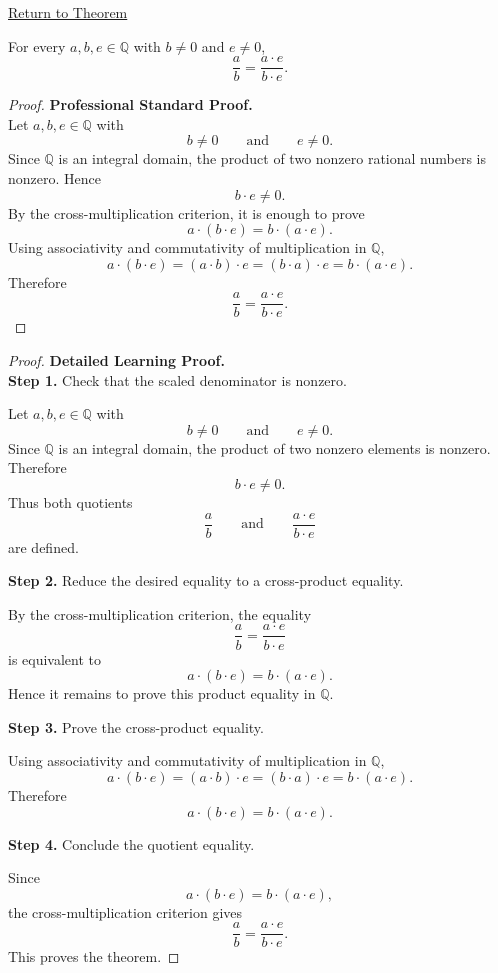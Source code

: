 \newpage
{}
\label{prf:rational-fraction-scaling}

\begin{remark*}[Return]
\hyperref[thm:rational-fraction-scaling]{Return to Theorem}
\end{remark*}

\begin{theorem*}
For every $a,b,e\in\mathbb{Q}$ with $b\neq 0$ and $e\neq 0$,
\[
\frac{a}{b}=\frac{a\cdot e}{b\cdot e}.
\]
\end{theorem*}

\begin{proof}
\textbf{Professional Standard Proof.}~\\
Let $a,b,e\in\mathbb{Q}$ with
\[
b\neq 0
\qquad\text{and}\qquad
e\neq 0.
\]
Since $\mathbb{Q}$ is an integral domain, the product of two nonzero
rational numbers is nonzero. Hence
\[
b\cdot e\neq 0.
\]
By the cross-multiplication criterion, it is enough to prove
\[
a\cdot (b\cdot e)=b\cdot (a\cdot e).
\]
Using associativity and commutativity of multiplication in $\mathbb{Q}$,
\[
a\cdot (b\cdot e)
=
(a\cdot b)\cdot e
=
(b\cdot a)\cdot e
=
b\cdot (a\cdot e).
\]
Therefore
\[
\frac{a}{b}=\frac{a\cdot e}{b\cdot e}.
\]
\end{proof}

\begin{proof}
\textbf{Detailed Learning Proof.}~\\

\textbf{Step 1.} Check that the scaled denominator is nonzero.

Let $a,b,e\in\mathbb{Q}$ with
\[
b\neq 0
\qquad\text{and}\qquad
e\neq 0.
\]
Since $\mathbb{Q}$ is an integral domain, the product of two nonzero
elements is nonzero. Therefore
\[
b\cdot e\neq 0.
\]
Thus both quotients
\[
\frac{a}{b}
\qquad\text{and}\qquad
\frac{a\cdot e}{b\cdot e}
\]
are defined.

\textbf{Step 2.} Reduce the desired equality to a cross-product equality.

By the cross-multiplication criterion, the equality
\[
\frac{a}{b}=\frac{a\cdot e}{b\cdot e}
\]
is equivalent to
\[
a\cdot (b\cdot e)=b\cdot (a\cdot e).
\]
Hence it remains to prove this product equality in $\mathbb{Q}$.

\textbf{Step 3.} Prove the cross-product equality.

Using associativity and commutativity of multiplication in $\mathbb{Q}$,
\[
a\cdot (b\cdot e)
=
(a\cdot b)\cdot e
=
(b\cdot a)\cdot e
=
b\cdot (a\cdot e).
\]
Therefore
\[
a\cdot (b\cdot e)=b\cdot (a\cdot e).
\]

\textbf{Step 4.} Conclude the quotient equality.

Since
\[
a\cdot (b\cdot e)=b\cdot (a\cdot e),
\]
the cross-multiplication criterion gives
\[
\frac{a}{b}=\frac{a\cdot e}{b\cdot e}.
\]
This proves the theorem.
\end{proof}

